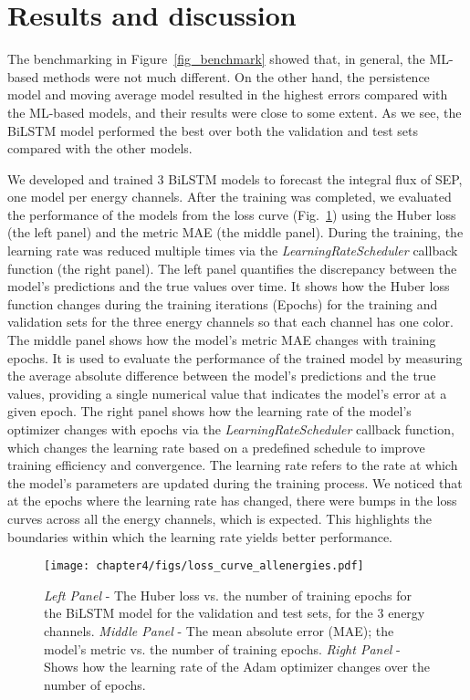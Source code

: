 \section{Results and discussion}
\label{sec_ch4_results}
The benchmarking in Figure~\ref{fig_benchmark} showed that, in general, the ML-based methods were not much different. On the other hand, the persistence model and moving average model resulted in the highest errors compared with the ML-based models, and their results were close to some extent. 
As we see, the BiLSTM model performed the best over both the validation and test sets compared with the other models.

We developed and trained 3 BiLSTM models to forecast the integral flux of SEP, one model per energy channels. After the training was completed, we evaluated the performance of the models from the loss curve (Fig.~\ref{fig_lossCurve}) using the Huber loss (the left panel) and the metric MAE (the middle panel). During the training, the learning rate was reduced multiple times via the \textit{LearningRateScheduler} callback function (the right panel).
The left panel quantifies the discrepancy between the model's predictions and the true values over time. It shows how the Huber loss function changes during the training iterations (Epochs) for the training and validation sets for the three energy channels so that each channel has one color.
The middle panel shows how the model's metric MAE changes with training epochs. It is used to evaluate the performance of the trained model by measuring the average absolute difference between the model's predictions and the true values, providing a single numerical value that indicates the model's error at a given epoch.
The right panel shows how the learning rate of the model's optimizer changes with epochs via the \textit{LearningRateScheduler} callback function, which changes the learning rate based on a predefined schedule to improve training efficiency and convergence.
The learning rate refers to the rate at which the model's parameters are updated during the training process.
We noticed that at the epochs where the learning rate has changed, there were bumps in the loss curves across all the energy channels, which is expected. This highlights the boundaries within which the learning rate yields better performance.

\begin{figure}[htp]
    \centerline{\texttt{[image: chapter4/figs/loss\_curve\_allenergies.pdf]}}
    \caption{\textit{Left Panel} - The Huber loss vs. the number of training epochs for the BiLSTM model for the validation and test sets, for the 3 energy channels. \textit{Middle Panel} - The mean absolute error (MAE); the model's metric vs. the number of training epochs. \textit{Right Panel} - Shows how the learning rate of the Adam optimizer changes over the number of epochs.}
\label{fig_lossCurve}
\end{figure}

